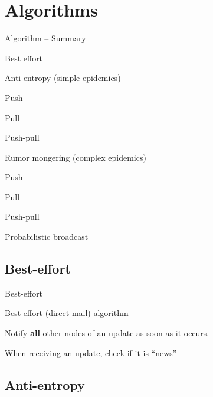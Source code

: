 \section{Algorithms}

\begin{frame}{Algorithm -- Summary}

\BIL
\item Best effort
\item \alert{Anti-entropy} (\alert{simple epidemics})
\BI
\item Push
\item Pull
\item Push-pull
\EI
\item \alert{Rumor mongering} (\alert{complex epidemics})
\BI
\item Push
\item Pull
\item Push-pull
\EI
\item Probabilistic broadcast
\EIL

\end{frame}

\subsection{Best-effort}

\begin{frame}{Best-effort}

\begin{block}{Best-effort (direct mail) algorithm}
\BI
\item Notify \textbf{all} other nodes of an update as soon as it
occurs. 
\item When receiving an update, check if it is “news” 
\EI
\end{block}

\begin{Procedure}
\caption{Direct mail protocol executed by process $p_i$:}
\BlankLine
{}
\end{Procedure}

\end{frame}

\subsection{Anti-entropy}

